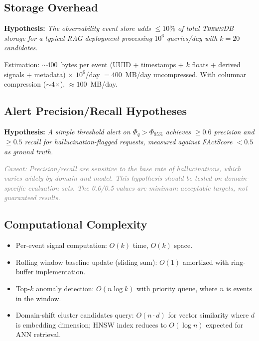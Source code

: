 \documentclass[11pt,a4paper]{article}
\newcommand{\themisdb}{\textsc{ThemisDB}}
\newcommand{\hypothesis}[1]{\textbf{Hypothesis:} \textit{#1}}
\newcommand{\caveat}[1]{\textcolor{gray}{\small\textit{Caveat: #1}}}
\theoremstyle{definition}
\begin{document}
\subsection{Storage Overhead}

\hypothesis{The observability event store adds $\leq 10\%$ of total
\themisdb{} storage for a typical RAG deployment processing
$10^6$ queries/day with $k=20$ candidates.}

Estimation:
$\sim 400$~bytes per event (UUID + timestamps + $k$ floats + derived
signals + metadata) $\times$ $10^6$/day $= 400$~MB/day uncompressed.
With columnar compression ($\sim$4$\times$), $\approx 100$~MB/day.

\subsection{Alert Precision/Recall Hypotheses}

\hypothesis{A simple threshold alert on $\Phi_q > \Phi_{95\%}$
achieves $\geq 0.6$ precision and $\geq 0.5$ recall for
hallucination-flagged requests, measured against FActScore $< 0.5$
as ground truth.}

\caveat{Precision/recall are sensitive to the base rate of
hallucinations, which varies widely by domain and model.
This hypothesis should be tested on domain-specific evaluation sets.
The 0.6/0.5 values are \emph{minimum acceptable} targets, not
guaranteed results.}

\subsection{Computational Complexity}

\begin{itemize}[noitemsep]
  \item Per-event signal computation: $O(k)$ time, $O(k)$ space.
  \item Rolling window baseline update (sliding sum): $O(1)$ amortized
    with ring-buffer implementation.
  \item Top-$k$ anomaly detection: $O(n \log k)$ with priority queue,
    where $n$ is events in the window.
  \item Domain-shift cluster candidates query: $O(n \cdot d)$ for
    vector similarity where $d$ is embedding dimension;
    HNSW index reduces to $O(\log n)$ expected for ANN retrieval.
\end{itemize}

\end{document}
